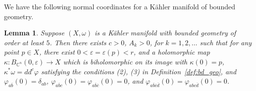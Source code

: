 \documentclass[a4paper, 11pt]{amsart}
\theoremstyle{plain}
\numberwithin{equation}{section} %
\numberwithin{figure}{section} %
\theoremstyle{plain}
\theoremstyle{plain}
\theoremstyle{plain}
\theoremstyle{plain}
\newtheorem{lemma}[theorem]{Lemma} %
\theoremstyle{remark}
\theoremstyle{definition}
\theoremstyle{definition}
\begin{document}
We have the following normal coordinates for a K\"ahler manifold of bounded geometry.
\begin{lemma}\label{lem:normal_chart}
Suppose $(X,\omega)$ is a K\"ahler manifold with bounded geometry of order at least $ 5$.  Then there exists   $c>0$, $A_k>0$, for $k=1,2, \ldots $  such that for  any point $p\in X$,  there exist $0<\varepsilon=\varepsilon(p)< r$,  and a holomorphic map  $\kappa:  B_{\mathbb{C}^n}(0,\varepsilon) \rightarrow X $ which is biholomorphic on its image  with $\kappa(0)=p$, $\kappa^* \omega=dd^c \varphi$ satisfying the conditions (2), (3) in  Definition~\ref{def:bd_geo}, and $\varphi_{a\overline{b}}(0)=\delta_{a b}$, 
$\varphi_{a\overline{b} c}(0)=\varphi_{a\overline{b}\overline{c}}(0)=0$, and  $\varphi_{a \overline{b}\overline{c} \overline{d}}(0)=\varphi_{a b c\overline {d}}(0)=0$. 
\end{lemma}
\end{document}
